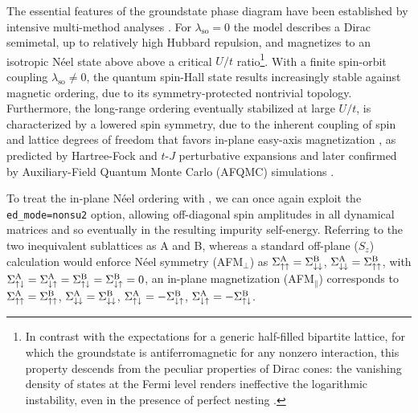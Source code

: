 \documentclass[edipack_sp.tex]{subfiles}
\begin{document}
The essential features of the groundstate phase diagram have been established by intensive multi-method analyses \cite{Rachel2018ROPIP}.
For $\lambda_\mathrm{so}=0$ the model describes a Dirac semimetal, up to relatively high Hubbard repulsion, and magnetizes to an isotropic Néel state above above a critical $U/t$ ratio\footnote{In contrast with the expectations for a generic half-filled bipartite lattice, for which the groundstate is antiferromagnetic for any nonzero interaction, this property descends from the peculiar properties of Dirac cones: the vanishing density of states
at the Fermi level renders ineffective the logarithmic instability, even in the presence of perfect nesting \cite{SorellaTosatti92,Graphene_RMP}.}.
With a finite spin-orbit coupling $\lambda_\mathrm{so}\neq0$, the quantum spin-Hall state results increasingly stable against magnetic ordering, due to its symmetry-protected nontrivial topology. Furthermore, the long-range ordering 
eventually stabilized at large $U/t$, is characterized by a lowered spin symmetry, due to the inherent coupling of spin and lattice degrees of freedom that favors in-plane easy-axis magnetization
\cite{3dXY_KMH}, as predicted by Hartree-Fock and $t$-$J$ perturbative expansions \cite{Rachel2010PRBa,Rachel2010PRB} and
later confirmed by Auxiliary-Field Quantum Monte Carlo (AFQMC) 
simulations \cite{Hohenadler2013ROPIP}.

To treat the in-plane Néel ordering with \NAME, we can once again
exploit the \texttt{ed\_mode=nonsu2} option, allowing off-diagonal 
spin amplitudes in all dynamical matrices and so eventually in the
resulting impurity self-energy.
Referring to the two inequivalent sublattices as
A and B, whereas a standard off-plane ($S_z$)
calculation would enforce Néel symmetry (AFM$_\perp$)  as
$\Sigma^\mathrm{A}_{\uparrow\uparrow} = \Sigma^\mathrm{B}_{\downarrow\downarrow}$, 
$\Sigma^\mathrm{A}_{\downarrow\downarrow} = \Sigma^\mathrm{B}_{\uparrow\uparrow}$,
with
$\Sigma^\mathrm{A}_{\uparrow\downarrow} = \Sigma^\mathrm{A}_{\downarrow\uparrow} = \Sigma^\mathrm{B}_{\uparrow\downarrow} = \Sigma^\mathrm{B}_{\downarrow\uparrow} = 0$,
an in-plane magnetization (AFM$_\parallel$) corresponds to
$\Sigma^\mathrm{A}_{\uparrow\uparrow} = \Sigma^\mathrm{B}_{\uparrow\uparrow}$, 
$\Sigma^\mathrm{A}_{\downarrow\downarrow} = \Sigma^\mathrm{B}_{\downarrow\downarrow}$,
$\Sigma^\mathrm{A}_{\uparrow\downarrow} = -\Sigma^\mathrm{B}_{\downarrow\uparrow}$, 
$\Sigma^\mathrm{A}_{\downarrow\uparrow} = -\Sigma^\mathrm{B}_{\uparrow\downarrow}$.
\end{document}
